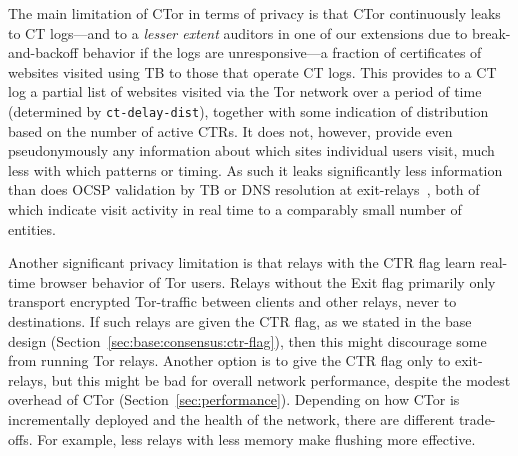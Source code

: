 The main limitation of CTor in terms of privacy is that CTor continuously leaks
to CT logs---and to a \emph{lesser extent} auditors in one of our extensions due
to break-and-backoff behavior if the logs are unresponsive---a fraction of
certificates of websites visited using TB to those that operate CT logs.
This provides
to a CT log a partial list of websites visited via the Tor network over a period
of time (determined by \texttt{ct-delay-dist}), together with some indication of
distribution based on the number of active CTRs. It does not, however, provide
even pseudonymously any information about which sites individual users visit,
much less with which patterns or timing. As such it leaks significantly less
information than does OCSP validation by TB or DNS resolution at
exit-relays~\cite{TorDNS}, both of which indicate visit activity in real time to
a comparably small number of entities.

Another significant privacy limitation is that relays with the CTR flag learn
real-time browser behavior of Tor users. Relays without the Exit flag primarily
only transport encrypted Tor-traffic between clients and other relays, never to
destinations. If such relays are given the CTR flag, as we stated in the base
design (Section~\ref{sec:base:consensus:ctr-flag}), then this might discourage
some from running Tor relays. Another option is to give the CTR flag only to
exit-relays, but this might be bad for overall network performance, despite the
modest overhead of CTor (Section~\ref{sec:performance}). Depending on how CTor
is incrementally deployed and the health of the network, there are different
trade-offs. For example, less relays with less memory make flushing more
effective.
